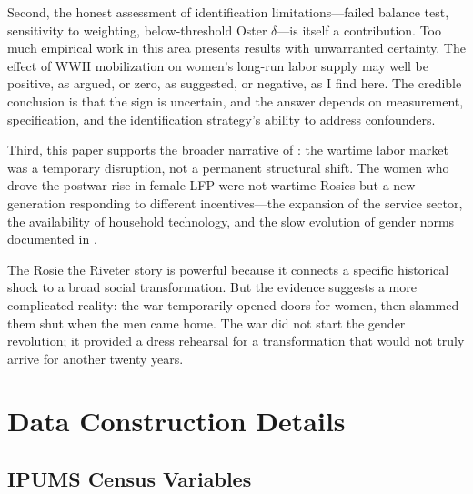 \documentclass[12pt]{article}
\begin{document}
Second, the honest assessment of identification limitations---failed balance test, sensitivity to weighting, below-threshold Oster $\delta$---is itself a contribution. Too much empirical work in this area presents results with unwarranted certainty. The effect of WWII mobilization on women's long-run labor supply may well be positive, as \citet{acemoglu2004women} argued, or zero, as \citet{goldin1991role} suggested, or negative, as I find here. The credible conclusion is that the sign is uncertain, and the answer depends on measurement, specification, and the identification strategy's ability to address confounders.

Third, this paper supports the broader narrative of \citet{rose2018rise}: the wartime labor market was a temporary disruption, not a permanent structural shift. The women who drove the postwar rise in female LFP were not wartime Rosies but a new generation responding to different incentives---the expansion of the service sector, the availability of household technology, and the slow evolution of gender norms documented in \citet{goldin2006quiet}.

The Rosie the Riveter story is powerful because it connects a specific historical shock to a broad social transformation. But the evidence suggests a more complicated reality: the war temporarily opened doors for women, then slammed them shut when the men came home. The war did not start the gender revolution; it provided a dress rehearsal for a transformation that would not truly arrive for another twenty years.

\label{apep_main_text_end}





\appendix
\renewcommand{\thesection}{A\arabic{section}}
\renewcommand{\thetable}{A\arabic{table}}
\renewcommand{\thefigure}{A\arabic{figure}}

\section{Data Construction Details}
\label{app:data}

\subsection{IPUMS Census Variables}
\end{document}

